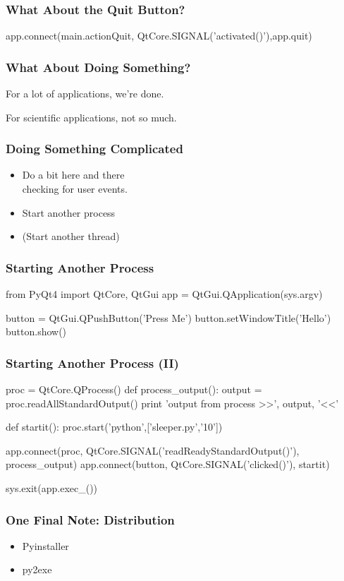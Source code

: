 \begin{frame}[fragile]
\frametitle{What About the Quit Button?}
\begin{python}
app.connect(main.actionQuit,
        QtCore.SIGNAL('activated()'),app.quit)
\end{python}
\end{frame}

\begin{frame}[fragile]
\frametitle{What About Doing Something?}

For a lot of applications, we're done.

For scientific applications, not so much.
\end{frame}

\begin{frame}[fragile]
\frametitle{Doing Something Complicated}
\begin{itemize}
\item Do a bit here and there\\
    checking for user events.
\item Start another process
\item (Start another thread)
\end{itemize}
\end{frame}

\begin{frame}[fragile]
\frametitle{Starting Another Process}
\begin{python}
from PyQt4 import QtCore, QtGui
app = QtGui.QApplication(sys.argv)

button = QtGui.QPushButton('Press Me')
button.setWindowTitle('Hello')
button.show()


\end{python}

\end{frame}
\begin{frame}[fragile]
\frametitle{Starting Another Process (II)}
\begin{python}

proc = QtCore.QProcess()
def process_output():
    output = proc.readAllStandardOutput()
    print 'output from process >>', output, '<<'

def startit():
    proc.start('python',['sleeper.py','10'])

app.connect(proc,
            QtCore.SIGNAL('readReadyStandardOutput()'), process_output)
app.connect(button,
            QtCore.SIGNAL('clicked()'), startit)

sys.exit(app.exec_())
\end{python}
\end{frame}

\begin{frame}[fragile]
\frametitle{One Final Note: Distribution}
\begin{itemize}
\item Pyinstaller
\item py2exe
\end{itemize}
\end{frame}

